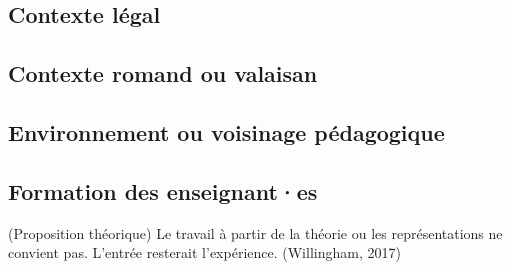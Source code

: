 \documentclass[
  french,
]{article}
\begin{document}
\hypertarget{contexte-luxe9gal}{%
\subsection{Contexte légal}\label{contexte-luxe9gal}}

\hypertarget{contexte-romand-ou-valaisan}{%
\subsection{Contexte romand ou valaisan}\label{contexte-romand-ou-valaisan}}

\hypertarget{environnement-ou-voisinage-puxe9dagogique}{%
\subsection{Environnement ou voisinage pédagogique}\label{environnement-ou-voisinage-puxe9dagogique}}

\hypertarget{formation-des-enseignantes}{%
\subsection{Formation des enseignant·es}\label{formation-des-enseignantes}}

(Proposition théorique) Le travail à partir de la théorie ou les représentations ne convient pas. L'entrée resterait l'expérience. (Willingham, 2017)
\end{document}
